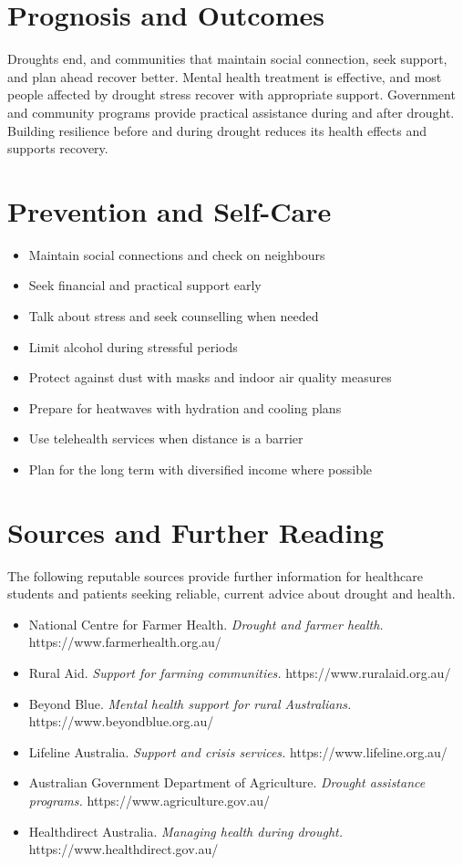 \section*{Prognosis and Outcomes}
Droughts end, and communities that maintain social connection, seek support, and plan ahead recover better. Mental health treatment is effective, and most people affected by drought stress recover with appropriate support. Government and community programs provide practical assistance during and after drought. Building resilience before and during drought reduces its health effects and supports recovery.

\section*{Prevention and Self-Care}
\begin{itemize}
    \item Maintain social connections and check on neighbours
    \item Seek financial and practical support early
    \item Talk about stress and seek counselling when needed
    \item Limit alcohol during stressful periods
    \item Protect against dust with masks and indoor air quality measures
    \item Prepare for heatwaves with hydration and cooling plans
    \item Use telehealth services when distance is a barrier
    \item Plan for the long term with diversified income where possible
\end{itemize}

\section*{Sources and Further Reading}
The following reputable sources provide further information for healthcare students and patients seeking reliable, current advice about drought and health.

\begin{itemize}
    \item National Centre for Farmer Health. \textit{Drought and farmer health.} https://www.farmerhealth.org.au/
    \item Rural Aid. \textit{Support for farming communities.} https://www.ruralaid.org.au/
    \item Beyond Blue. \textit{Mental health support for rural Australians.} https://www.beyondblue.org.au/
    \item Lifeline Australia. \textit{Support and crisis services.} https://www.lifeline.org.au/
    \item Australian Government Department of Agriculture. \textit{Drought assistance programs.} https://www.agriculture.gov.au/
    \item Healthdirect Australia. \textit{Managing health during drought.} https://www.healthdirect.gov.au/
\end{itemize}
